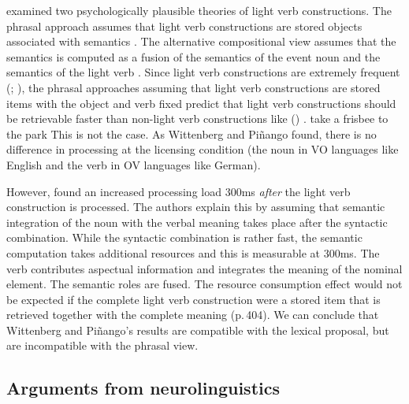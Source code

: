 \begin{exe}
\begin{xlist}[iv.]
\begin{exe}
\begin{xlist}[iv.]
\citet{WP2011a} examined two psychologically plausible theories of light verb constructions.  The phrasal approach 
 assumes that light verb constructions are stored objects associated with semantics \citep{Goldberg2003a}.
The alternative compositional view assumes that the semantics is computed as a fusion of the
semantics of the event noun and the semantics of the
light verb \citep{Grimshaw97a-u,Butt2003a-u,Jackendoff2002a-u,CJ2005a,MuellerPersian,BPW2008a-u}.  
Since light verb constructions are extremely frequent (\citealp*{Pinango:2006qy};
\citealp[]{WP2011a}), the phrasal approaches assuming that
light verb constructions are stored items with the object and verb fixed predict that light verb
constructions should be retrievable faster than non-light verb constructions like () \citep[]{WP2011a}. 
\ea
take a frisbee to the park
\z
This is not the case. As Wittenberg and Piñango found, there is no difference in processing at the licensing
condition (the noun in VO languages like English and the verb in OV languages like German). 


However, \citet{WP2011a} found an increased processing load 300ms \emph{after} the light verb construction is
processed. The authors explain this by assuming that semantic integration of the noun with the
verbal meaning takes place after the syntactic
combination. While the syntactic combination is rather fast, the semantic computation takes
additional resources and this is measurable at 300ms. The verb contributes aspectual information and integrates
the meaning of the nominal element. The semantic roles are fused. The resource consumption effect
would not be expected if the complete light verb construction were a stored item that is
retrieved together with the complete meaning (p.\,404). We can conclude that Wittenberg and
Piñango's results are compatible with the lexical proposal, but are
incompatible with the phrasal view. %


\subsection{Arguments from neurolinguistics}
\label{sec-neuro-linguistics}



\end{xlist}
\end{exe}
\end{xlist}
\end{exe}

